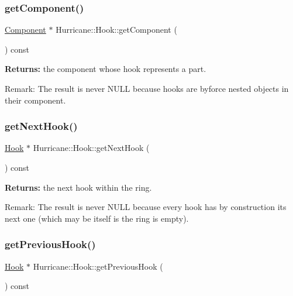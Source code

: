 \subsubsection{\texorpdfstring{get\+Component()}{getComponent()}}
{\footnotesize\ttfamily \hyperlink{classHurricane_1_1Component}{Component} $\ast$ Hurricane\+::\+Hook\+::get\+Component (\begin{DoxyParamCaption}{ }\end{DoxyParamCaption}) const\hspace{0.3cm}{\ttfamily [pure virtual]}}

{\bfseries Returns\+:} the component whose hook represents a part.

\begin{DoxyParagraph}{Remark\+:}
The result is never N\+U\+LL because hooks are byforce nested objects in their component. 
\end{DoxyParagraph}
\mbox{\label{classHurricane_1_1Hook_a03044fa995d6d784d6c441927ca8af04}} 
\subsubsection{\texorpdfstring{get\+Next\+Hook()}{getNextHook()}}
{\footnotesize\ttfamily \hyperlink{classHurricane_1_1Hook}{Hook} $\ast$ Hurricane\+::\+Hook\+::get\+Next\+Hook (\begin{DoxyParamCaption}{ }\end{DoxyParamCaption}) const}

{\bfseries Returns\+:} the next hook within the ring.

\begin{DoxyParagraph}{Remark\+:}
The result is never N\+U\+LL because every hook has by construction its next one (which may be itself is the ring is empty). 
\end{DoxyParagraph}
\mbox{\label{classHurricane_1_1Hook_ad69ebbbf3d64343aca23ca435f24c624}} 
\subsubsection{\texorpdfstring{get\+Previous\+Hook()}{getPreviousHook()}}
{\footnotesize\ttfamily \hyperlink{classHurricane_1_1Hook}{Hook} $\ast$ Hurricane\+::\+Hook\+::get\+Previous\+Hook (\begin{DoxyParamCaption}{ }\end{DoxyParamCaption}) const}


